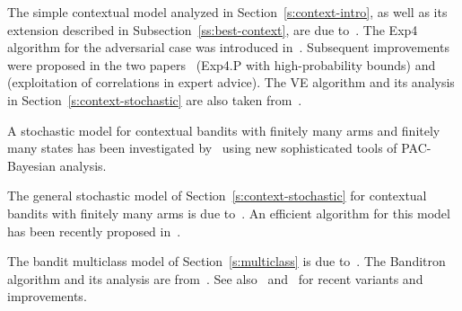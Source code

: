 \documentclass[11pt]{hackednow}
\begin{document}
The simple contextual model analyzed in Section~\ref{s:context-intro}, as well as its extension described in Subsection~\ref{ss:best-context}, are due to~\cite{maillard2011adaptive}. The Exp4 algorithm for the adversarial case was introduced in~\cite{ACFS03}. Subsequent improvements were proposed in the two papers~\cite{beygelzimer2011contextual} (Exp4.P with high-probability bounds) and~\cite{mcmahan2009tighter} (exploitation of correlations in expert advice). The VE algorithm and its analysis in Section~\ref{s:context-stochastic} are also taken from~\cite{beygelzimer2011contextual}.

A stochastic model for contextual bandits with finitely many arms and finitely many states has been investigated by~\cite{NIPS2011_0948} using new sophisticated tools of PAC-Bayesian analysis.

The general stochastic model of Section~\ref{s:context-stochastic} for contextual bandits with finitely many arms is due to~\cite{langford2007epoch}. An efficient algorithm for this model has been recently proposed in~\cite{dudik2011efficient}.

The bandit multiclass model of Section~\ref{s:multiclass} is due to~\cite{langford2007epoch}. The Banditron algorithm and its analysis are from~\cite{kakade2008efficient}. See also~\cite{crammer2011multiclass} and~\cite{hazan2011newtron} for recent variants and improvements.
\end{document}

